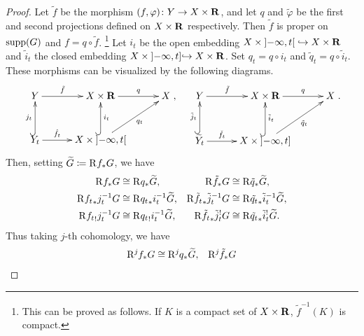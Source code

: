 \begin{proof}
  Let \(\tilde{f}\) be the morphism \(
    (f,\varphi)\colon Y\to X\times \rr
  \), and let \(q\) and \(\tilde{\varphi}\) be 
  the first and second projections 
  defined on \(X\times \rr\) respectively. 
  Then \(\tilde{f}\) is proper on \(\supp(G)\) and 
  \(f=q\circ \tilde{f}\). \footnote{This can be proved as follows. 
  If \(K\) is a compact set of \(X\times \rr\), 
  \(\tilde{f}^{-1}(K)\) is compact.}
  Let \(i_t\) be the open embedding \(
    X\times\lopen -\infty, t\ropen\hookrightarrow X\times \rr
  \) and \(\tilde{i}_t\) the closed embedding \(
    X\times\lopen -\infty, t\rclosed\hookrightarrow X\times \rr
  \). Set \(q_t=q\circ i_t\) and \(\tilde{q}_t=q\circ\tilde{i}_t\). 
  These morphisms can be visualized by the following diagrams.
  \[\xymatrix@C=30pt@R=30pt{
    Y
      \ar[r]^-{\tilde{f}}
    &
    X\times\rr
      \ar[r]^-{q}
    &
    X\\
    Y_{t}
      \ar@{^(->}[u]^-{j_t}
      \ar[r]^-{\hat{f}_{t}}
    &
    X\times \lopen-\infty,t\ropen
      \ar@{^(->}[u]_-{i_{t}}
      \ar[ur]_-{q_{t}}
    &
  },\quad
  \xymatrix@C=30pt@R=30pt{
    Y
      \ar[r]^-{\tilde{f}}
    &
    X\times\rr
      \ar[r]^-{q}
    &
    X\\
    \widetilde{Y}_{t}
      \ar@{^(->}[u]^-{\tilde{j}_t}
      \ar[r]^-{\check{f}_{t}}
    &
    X\times \lopen-\infty,t\rclosed
      \ar@{^(->}[u]_-{\tilde{i}_{t}}
      \ar[ur]_-{\tilde{q}_{t}}
    &
  }.\]
  Then, setting \(\widetilde{G}\coloneqq \Rder[]{f_{\ast}}G\), 
  we have \begin{align*}
    \Rder[]{f_{\ast}}G
    &\cong 
    \Rder[]{q_{\ast}}\widetilde{G},
    &
    \Rder[]{\tilde{f}_{\ast}}G
    &\cong 
    \Rder[]{\tilde{q}_{\ast}}\widetilde{G},
    \\
    \Rder[]{{f_{t}}_{\ast}}j_{t}^{-1}G
    &\cong 
    \Rder[]{{q_{t}}_{\ast}}i_{t}^{-1}\widetilde{G},
    &
    \Rder[]{\tilde{f_{t}}_{\ast}}\tilde{j}_{t}^{-1}G
    &\cong 
    \Rder[]{\tilde{q_{t}}_{\ast}}\tilde{i}_{t}^{-1}\widetilde{G},
    \\
    \Rder[]{{f_{t}}_{!}}j_{t}^{-1}G
    &\cong 
    \Rder[]{{q_{t}}_{!}}i_{t}^{-1}\widetilde{G},
    &
    \Rder[]{\tilde{f_{t}}_{\ast}}\tilde{j}_{t}^{!}G
    &\cong 
    \Rder[]{\tilde{q_{t}}_{\ast}}\tilde{i}_{t}^{!}\widetilde{G}.
  \end{align*}
  Thus taking \(j\)-th cohomology, we have\begin{align*}
    \Rder[j]{f_{\ast}}G
    &\cong 
    \Rder[j]{q_{\ast}}\widetilde{G},
    &
    \Rder[j]{\tilde{f}_{\ast}}G

\end{align*}
\end{proof}
